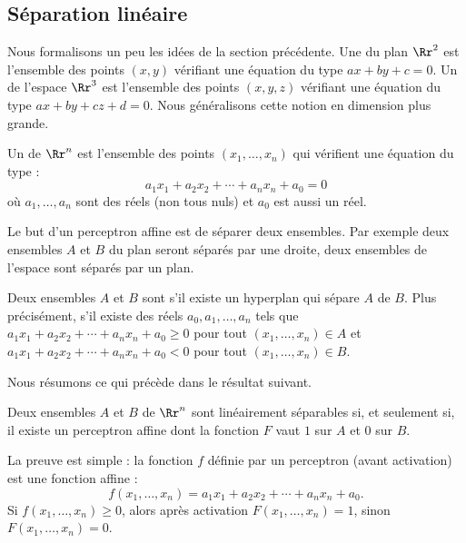 \documentclass[11pt,class=report,crop=false]{standalone}
\begin{document}
\subsection{Séparation linéaire}

Nous formalisons un peu les idées de la section précédente.
Une  du plan $\Rr^2$ est l'ensemble des points $(x,y)$ vérifiant une équation du type $ax+by+c=0$. Un  de l'espace $\Rr^3$ est l'ensemble des points $(x,y,z)$ vérifiant une équation du type $ax+by+cz+d=0$.  Nous généralisons cette notion en dimension plus grande.
\begin{definition}
Un  de $\Rr^n$ est l'ensemble des points $(x_1,\ldots,x_n)$ qui vérifient une équation du type :
$$a_1 x_1 + a_2 x_2 + \cdots + a_n x_n + a_0=0$$
où $a_1,\ldots,a_n$ sont des réels (non tous nuls) et $a_0$ est aussi un réel.
\end{definition}


Le but d'un perceptron affine est de séparer deux ensembles. Par exemple deux ensembles $A$ et $B$ du plan seront séparés par une droite, deux ensembles de l'espace sont séparés par un plan.

\begin{definition}
Deux ensembles $A$ et $B$ sont  s'il existe un hyperplan qui sépare $A$ de $B$. Plus précisément, s'il existe des réels  $a_0,a_1,\ldots,a_n$ tels que $a_1 x_1 + a_2 x_2 + \cdots + a_n x_n + a_0 \ge 0$ pour tout $(x_1,\ldots,x_n) \in A$ et $a_1 x_1 + a_2 x_2 + \cdots + a_n x_n + a_0 < 0$ pour tout $(x_1,\ldots,x_n) \in B$.
\end{definition}


Nous résumons ce qui précède dans le résultat suivant.
\begin{proposition}
Deux ensembles $A$ et $B$ de $\Rr^n$ sont linéairement séparables si, et seulement si, il existe un perceptron affine dont la fonction $F$ vaut $1$ sur $A$ et $0$ sur $B$.
\end{proposition}

La preuve est simple : la fonction $f$ définie par un perceptron (avant activation) est une fonction affine :
$$f(x_1,\ldots,x_n) = a_1 x_1 + a_2 x_2 + \cdots + a_n x_n + a_0.$$
Si $f(x_1,\ldots,x_n) \ge 0$, alors après activation $F(x_1,\ldots,x_n)=1$, sinon $F(x_1,\ldots,x_n)=0$.
\end{document}
